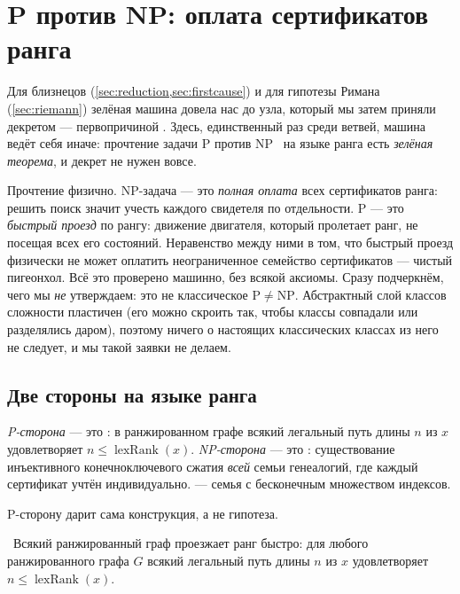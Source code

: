 \section{P против NP: оплата сертификатов ранга}\label{sec:pnp}

Для близнецов (\cref{sec:reduction,sec:firstcause}) и для гипотезы Римана (\cref{sec:riemann})
зелёная машина довела нас до узла, который мы затем приняли декретом --- первопричиной \axiom{}.
Здесь, единственный раз среди ветвей, машина ведёт себя иначе: прочтение задачи $\mathrm{P}$ против
$\mathrm{NP}$~\cite{clay-pnp} на языке ранга есть \emph{зелёная теорема}, и декрет не нужен вовсе.

Прочтение физично. $\mathrm{NP}$-задача --- это \emph{полная оплата} всех сертификатов ранга:
решить поиск значит учесть каждого свидетеля по отдельности. $\mathrm{P}$ --- это \emph{быстрый
проезд} по рангу: движение двигателя, который пролетает ранг, не посещая всех его состояний.
Неравенство между ними в том, что быстрый проезд физически не может оплатить неограниченное
семейство сертификатов --- чистый пигеонхол. Всё это проверено машинно, без всякой аксиомы. Сразу
подчеркнём, чего мы \emph{не} утверждаем: это не классическое $\mathrm{P}\neq\mathrm{NP}$.
Абстрактный слой классов сложности пластичен (его можно скроить так, чтобы классы совпадали или
разделялись даром), поэтому ничего о настоящих классических классах из него не следует, и мы такой
заявки не делаем.

\subsection{Две стороны на языке ранга}

\begin{definition}\label{def:pnp-sides}
\emph{P-сторона} --- это : в ранжированном графе всякий легальный путь
 длины $n$ из $x$ удовлетворяет $n \le \operatorname{lexRank}(x)$. \emph{NP-сторона} ---
это : существование инъективного конечноключевого сжатия
\emph{всей} семьи генеалогий, где каждый сертификат учтён индивидуально.
 --- семья с бесконечным множеством индексов.
\end{definition}

P-сторону дарит сама конструкция, а не гипотеза.

\begin{theorem}\label{thm:rankFastTraversal_holds}
\green{}\ Всякий ранжированный граф проезжает ранг быстро: для любого ранжированного графа $G$
всякий легальный путь  длины $n$ из $x$ удовлетворяет $n \le \operatorname{lexRank}(x)$.
\end{theorem}

